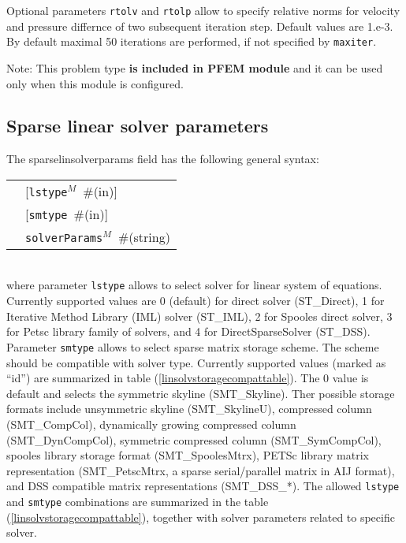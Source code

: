 \documentclass[a4paper]{article}
\newcommand{\param}[1]{\texttt{#1}} %
\newcommand{\optional}[1]{[#1]} %
\newcommand{\field}[2]{\param{#1}~\#{\tiny(#2)}} %
\newcommand{\optField}[2]{\optional{\field{#1}{#2}}}
\newenvironment{record}[1][]{\begin{tabular}{|ll}}{\end{tabular}\\}
\newcommand{\recentry}[2]{{#1}&{#2}\\}
\newcounter{rcc}
\newenvironment{record}[1][\textwidth]{\setcounter{rcc}{0}\rowcolors{1}{lightgray}{lightgray}\tabularx{#1}{llR} \hline}
               {\endtabularx}
\newcommand{\recentry}[2]{\ifthenelse{\value{rcc}>0}{$\backslash$ \\}{\setcounter{rcc}{1}}{#1}&{#2}&}
\begin{document}
Optional parameters \param{rtolv} and \param{rtolp} allow to
specify relative norms for velocity and pressure differnce of two subsequent iteration
step. Default values are 1.e-3. By default maximal 50 iterations are performed, if
not specified by \param{maxiter}.

Note: This problem type \textbf{is included in PFEM module} and it
can be used only when this module is configured.

\subsection{Sparse linear solver parameters}
\label{sparselinsolver}
The sparselinsolverparams field has the following general syntax:\\
\begin{record}
  \recentry{\hspace{20mm}}{\optField{lstype$^M$}{in}}
  \recentry{}{\optField{smtype}{in}}
  \recentry{}{\field{solverParams$^M$}{string}}
\end{record}
where parameter \param{lstype} allows to select solver for linear system of
equations. Currently supported values are 0 (default) for direct solver
(ST\_Direct), 1 for Iterative Method Library (IML) solver (ST\_IML),
2 for Spooles direct solver, 3 for Petsc
library family of solvers, and 4 for DirectSparseSolver (ST\_DSS).
Parameter \param{smtype} allows to select sparse matrix storage
scheme. The scheme should be compatible with solver type.
Currently supported values (marked as ``id'') are summarized in table
(\ref{linsolvstoragecompattable}). The 0 value is default and selects
the symmetric skyline (SMT\_Skyline). Ther possible storage formats
include unsymmetric skyline (SMT\_SkylineU),
compressed column (SMT\_CompCol), dynamically growing compressed
column (SMT\_DynCompCol), symmetric compressed column
(SMT\_SymCompCol), spooles library storage format (SMT\_SpoolesMtrx),
PETSc library matrix representation (SMT\_PetscMtrx, a sparse
serial/parallel matrix in AIJ format), and DSS compatible matrix
representations (SMT\_DSS\_*).
The allowed \param{lstype} and \param{smtype} combinations are
summarized in the table (\ref{linsolvstoragecompattable}), together
with solver parameters related to specific solver.
\end{document}
